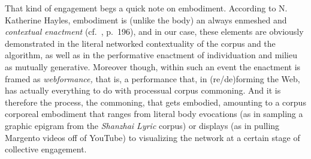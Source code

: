 That kind of engagement begs a quick note on embodiment. According to N.
Katherine Hayles, embodiment is (unlike the body) an always enmeshed and
\emph{contextual enactment} (cf.~\cite{hayles2008we}, p.~196), and in
our case, these elements are obviously demonstrated in the literal
networked contextuality of the corpus and the algorithm, as well as in
the performative enactment of individuation and milieu as mutually
generative. Moreover though, within such an event the enactment is
framed as \emph{webformance,} that is, a performance that, in
(re/de)forming the Web, has actually everything to do with processual
corpus commoning. And it is therefore the process, the commoning, that
gets embodied, amounting to a corpus corporeal embodiment that ranges
from literal body evocations (as in sampling a graphic epigram from the
\emph{Shanzhai Lyric} corpus) or displays (as in pulling Margento videos
off of YouTube) to visualizing the network at a certain stage of
collective engagement.

